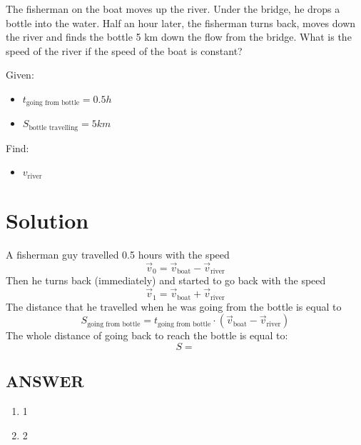 The fisherman on the boat moves up the river. Under the bridge, he drops a bottle into the water.
Half an hour later, the fisherman turns back, moves down the river and finds the bottle 5 km
down the flow from the bridge. What is the speed of the river if the speed of the boat is constant?

\bigbreak Given: \begin{itemize}
    \item $t_{\text{going from bottle}} = 0.5h$
    \item $S_{\text{bottle travelling}} = 5km$
\end{itemize}

Find: \begin{itemize}
    \item $v_{\text{river}}$
\end{itemize}

\section*{Solution}

A fisherman guy travelled 0.5 hours with the speed $$\Vec{v}_0 = \Vec{v}_{\text{boat}} - \Vec{v}_{\text{river}}$$
Then he turns back (immediately) and started to go back with the speed $$\Vec{v}_1 = \Vec{v}_{\text{boat}} + \Vec{v}_{\text{river}}$$
The distance that he travelled when he was going from the bottle is equal to $$S_{\text{going from bottle}} = t_{\text{going from bottle}} \cdot (\Vec{v}_{\text{boat}} - \Vec{v}_{\text{river}})$$
The whole distance of going back to reach the bottle is equal to:
$$S = $$


\vfill
\subsection*{ANSWER}
\begin{enumerate}
    \item 1
    \item 2
\end{enumerate}


